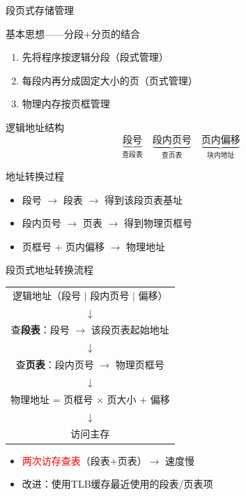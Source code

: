 \documentclass[10pt, aspectratio=169]{beamer}
\begin{document}
\begin{frame}{段页式存储管理}
    \begin{block}{基本思想——分段+分页的结合}
        \begin{enumerate}
            \item 先将程序按逻辑分段（段式管理）
            \item 每段内再分成固定大小的页（页式管理）
            \item 物理内存按页框管理
        \end{enumerate}
    \end{block}
    \vspace{0.3em}
    \begin{block}{逻辑地址结构}
        \[
            \underbrace{\text{段号}}_{\text{查段表}} \quad
            \underbrace{\text{段内页号}}_{\text{查页表}} \quad
            \underbrace{\text{页内偏移}}_{\text{块内地址}}
        \]
    \end{block}
    \vspace{0.3em}
    \begin{block}{地址转换过程}
        \begin{itemize}
            \item 段号 $\to$ 段表 $\to$ 得到该段页表基址
            \item 段内页号 $\to$ 页表 $\to$ 得到物理页框号
            \item 页框号 + 页内偏移 $\to$ 物理地址
        \end{itemize}
    \end{block}
\end{frame}

\begin{frame}{段页式地址转换流程}
    \begin{center}
        \begin{tabular}{c}
            逻辑地址（段号 $|$ 段内页号 $|$ 偏移） \\
            $\downarrow$ \\
            查\textbf{段表}：段号 $\to$ 该段页表起始地址 \\
            $\downarrow$ \\
            查\textbf{页表}：段内页号 $\to$ 物理页框号 \\
            $\downarrow$ \\
            物理地址 = 页框号 $\times$ 页大小 + 偏移 \\
            $\downarrow$ \\
            访问主存
        \end{tabular}
    \end{center}
    \vspace{0.5em}
    \begin{itemize}
        \item \textcolor{red}{两次访存查表}（段表+页表）$\to$ 速度慢
        \item 改进：使用TLB缓存最近使用的段表/页表项
    \end{itemize}
\end{frame}
\end{document}
